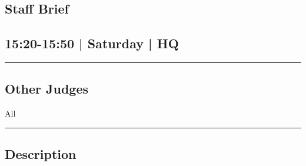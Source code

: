 \documentclass[10pt, A5]{article}
\begin{document}
		\begin{framed}
			\begin{minipage}{\textwidth}

			\setcounter{section}{53}
							\section{Staff Brief}
						
			\subsection*{15:20-15:50 | Saturday | HQ}

			\vspace{0.25cm}
			\hrule
			\vspace{0.25cm}


			\subsection*{Other Judges}
							All

					\vspace{0.25cm}
			\hrule
			\vspace{0.25cm}

			\begin{minipage}{\textwidth}
			\subsection*{\faListAlt \: Description}
			
			\end{minipage}


	\end{minipage}
	\end{framed}

	
\end{document}
